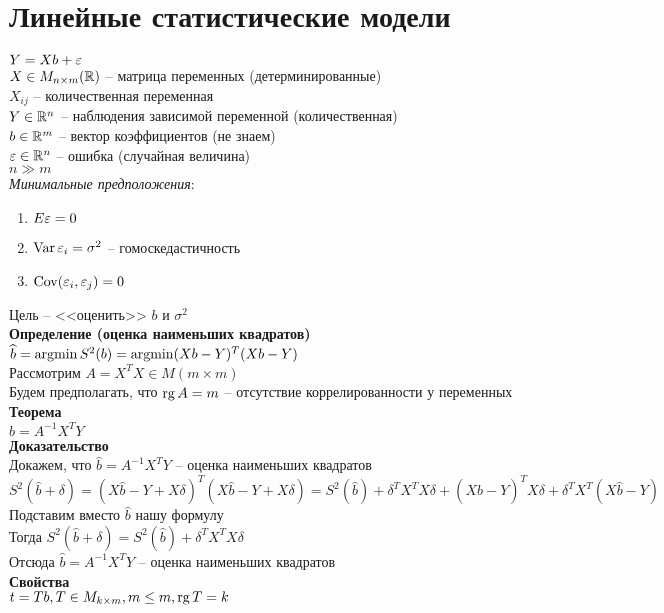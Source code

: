 \documentclass[12pt]{article}
\begin{document}
\section{Линейные статистические модели}
$Y=Xb + \varepsilon$\\
$X \in M_{n\times m}(\mathbb{R})$ -- матрица переменных (детерминированные)\\
$X_{ij}$ -- количественная переменная\\
$Y\in \mathbb{R}^n$ -- наблюдения зависимой переменной (количественная)\\
$b \in \mathbb{R}^m$ -- вектор коэффициентов (не знаем)\\
$\varepsilon \in \mathbb{R}^n$ -- ошибка (случайная величина)\\
$n \gg m$\\
\textit{Минимальные предположения}:
\begin{enumerate}
	\item $E\varepsilon = 0$
	\item $\operatorname{Var} \varepsilon_i = \sigma^2$ -- гомоскедастичность  
	\item $\operatorname{Cov}(\varepsilon_i, \varepsilon_j) = 0$
\end{enumerate}
Цель -- <<оценить>> $b$ и $\sigma^2$\\
\textbf{Определение (оценка наименьших квадратов)}\\
$\widehat b = \operatorname{argmin} S^2(b) = \operatorname{argmin} (Xb-Y)^T(Xb-Y)$\\
Рассмотрим $A = X^TX \in M(m\times m)$\\
Будем предполагать, что $\operatorname{rg} A = m$ -- отсутствие коррелированности у переменных\\
\textbf{Теорема}\\
$\widehat b = A^{-1}X^TY$\\
\textbf{Доказательство}\\
Докажем, что $\widehat b = A^{-1}X^TY$ -- оценка наименьших квадратов\\
$S^2(\widehat b + \delta) = (X\widehat b - Y + X\delta)^T(X\widehat b - Y + X\delta) = S^2(\widehat b) + \delta^TX^TX\delta + (X\widehat b - Y)^T X\delta + \delta^TX^T(X\widehat b - Y)$\\
Подставим вместо $\widehat b$ нашу формулу\\
Тогда $S^2(\widehat b + \delta) = S^2(\widehat b) + \delta^T X^T X\delta$\\
Отсюда $\widehat b = A^{-1}X^TY$ -- оценка наименьших квадратов\\
\textbf{Свойства}\\
$t = Tb, T \in M_{k \times m}, m \leq m, \operatorname{rg} T = k$\\
\end{document}
